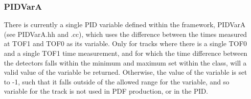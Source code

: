 \documentclass[a4paper,12pt]{article}
\begin{document}
\subsubsection{PIDVarA}
\label{PIDVarA}
There is currently a single PID variable defined within the framework, 
PIDVarA (see PIDVarA.hh and .cc), which uses the difference between the times measured at TOF1 
and TOF0 as its variable. Only for tracks where there is a single TOF0 
and a single TOF1 time measurement, and for which the time difference 
between the detectors falls within the minimum and maximum set within 
the class, will a valid value of the variable be returned. Otherwise, 
the value of the variable is set to -1, such that it falls outside of 
the allowed range for the variable, and so variable for the track is 
not used in PDF production, or in the PID.

\clearpage


\end{document}

